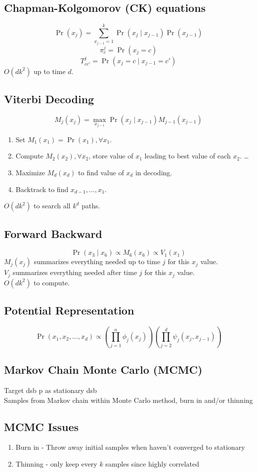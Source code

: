 \subsection*{Chapman-Kolgomorov (CK) equations}
\[\Pr(x_j)=\sum_{x_{j-1}=1}^k \Pr(x_j\mid x_{j-1})\Pr(x_{j-1})\]
\[\pi_c^j = \Pr(x_j=c)\]
\[T_{cc'}^j = \Pr(x_j=c\mid x_{j-1}=c')\]
$O(dk^2)$ up to time $d$.
\subsection*{Viterbi Decoding}
\[M_j(x_j)=\max_{x_{j-1}}\Pr(x_j\mid x_{j-1})M_{j-1}(x_{j-1})\]
\begin{enumerate}
    \item Set $M_1(x_1)=\Pr(x_1),\forall x_1$.
    \item Compute $M_2(x_2),\forall x_2$, store value of $x_1$ leading to best value of each $x_2$. \dots
    \item Maximize $M_d(x_d)$ to find value of $x_d$ in decoding.
    \item Backtrack to find $x_{d-1},\dots,x_1$.
\end{enumerate}
$O(dk^2)$ to search all $k^d$ paths.
\subsection*{Forward Backward}
\[\Pr(x_3\mid x_6)\propto M_6(x_6) \propto V_1(x_1)\]
$M_j(x_j)$ summarizes everything needed up to time $j$ for this $x_j$ value.\\
$V_j$ summarizes everything needed after time $j$ for this $x_j$ value.\\
$O(dk^2)$ to compute.
\subsection*{Potential Representation}
\[\Pr(x_1,x_2,\dots,x_d)\propto\left(\prod_{j=1}^n \phi_j(x_j)\right)\left(\prod_{j=2}^d \psi_j(x_j,x_{j-1})\right)\]
\subsection*{Markov Chain Monte Carlo (MCMC)}
Target dsb p as stationary dsb\\
Samples from Markov chain within Monte Carlo method, burn in and/or thinning\\
\subsection*{MCMC Issues}
\begin{enumerate}
    \item Burn in - Throw away initial samples when haven't converged to stationary
    \item Thinning - only keep every $k$ samples since highly correlated
\end{enumerate}
